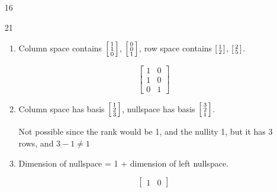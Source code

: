 \documentclass[12pt,letterpaper]{article}
\begin{document}
\begin{enumerate}[label=\S 2.\arabic*]
\begin{enumerate}
        \item [16]
        \item [21]
          \begin{enumerate}[label=(\alph*)]
            \item
              Column space contains $\begin{bsmallmatrix}1 \\ 1 \\ 0\end{bsmallmatrix}$, $\begin{bsmallmatrix}0 \\ 0 \\ 1\end{bsmallmatrix}$, row space contains $\begin{bsmallmatrix}1 \\ 2\end{bsmallmatrix}$, $\begin{bsmallmatrix}2 \\ 5\end{bsmallmatrix}$.

                \[
                  \begin{bmatrix}
                    1 & 0 \\
                    1 & 0 \\
                    0 & 1
                  \end{bmatrix}
                \]

            \item
              Column space has basis $\begin{bsmallmatrix}1 \\ 2 \\ 3\end{bsmallmatrix}$, nullspace has basis $\begin{bsmallmatrix}3 \\ 2 \\ 1\end{bsmallmatrix}$.

              Not possible since the rank would be 1, and the nullity 1, but it has 3 rows, and $3 - 1 \ne 1$

            \item
              Dimension of nullspace = 1 + dimension of left nullspace.

              \[
                \begin{bmatrix}
                  1 & 0
                \end{bmatrix}
              \]


\end{enumerate}
\end{enumerate}
\end{enumerate}
\end{document}
